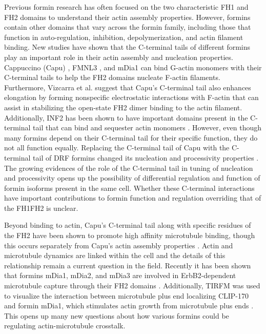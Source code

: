 Previous formin research has often focused on the two characteristic FH1 and FH2 domains to understand their actin assembly properties. However, formins contain other domains that vary across the formin family, including those that function in auto-regulation, inhibition, depolymerization, and actin filament binding. New studies have shown that the C-terminal tails of different formins play an important role in their actin assembly and nucleation properties. Cappuccino (Capu) \citep{vizcarra_role_2014}, FMNL3 \citep{heimsath_c_2012}, and mDia1 \citep{gould_formin_2011} can bind G-actin monomers with their C-terminal tails to help the FH2 domains nucleate F-actin filaments. Furthermore, Vizcarra et al. suggest that Capu's C-terminal tail also enhances elongation by forming nonspecific electrostatic interactions with F-actin that can assist in stabilizing the open-state FH2 dimer binding to the actin filament. Additionally, INF2 has been shown to have important domains present in the C-terminal tail that can bind and sequester actin monomers \citep{chhabra_inf2_2006}. However, even though many formins depend on their C-terminal tail for their specific function, they do not all function equally. Replacing the C-terminal tail of Capu with the C-terminal tail of DRF formins changed its nucleation and processivity properties \citep{vizcarra_role_2014}. The growing evidences of the role of the C-terminal tail in tuning of nucleation and processivity opens up the possibility of differential regulation and function of formin isoforms present in the same cell. Whether these C-terminal interactions have important contributions to formin function and regulation overriding that of the FH1FH2 is unclear. 

Beyond binding to actin, Capu's C-terminal tail along with specific residues of the FH2 have been shown to promote high affinity microtubule binding, though this occurs separately from Capu's actin assembly properties \citep{roth-johnson_interaction_2014}. Actin and microtubule dynamics are linked within the cell and the details of this relationship remain a current question in the field. Recently it has been shown that formins mDia1, mDia2, and mDia3 are involved in ErbB2-dependent microtubule capture through their FH2 domains \citep{daou_essential_2014}. Additionally, TIRFM was used to visualize the interaction between microtubule plus end localizing CLIP-170 and formin mDia1, which stimulates actin growth from microtubule plus ends \citep{henty-ridilla_accelerated_2016}. This opens up many new questions about how various formins could be regulating actin-microtubule crosstalk. 

